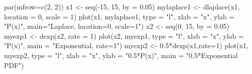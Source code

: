 \begin{Schunk}
\begin{Sinput}
 par(mfrow=c(2, 2)) 
 x1 <- seq(-15, 15, by = 0.05) 
 mylaplace1 <- dlaplace(x1, location = 0, scale = 1) 
 plot(x1, mylaplace1, type = "l", xlab = "x", ylab = "P(x)", 
  main="Laplace, location=0, scale=1")
 x2 <- seq(0, 15, by = 0.05)
 myexp1 <- dexp(x2, rate = 1) 
 plot(x2, myexp1, type = "l", xlab = "x", ylab = "P(x)", main = "Exponential, rate=1")
 myexp2 <- 0.5*dexp(x1,rate=1)
 plot(x1, myexp2, type = "l", xlab = "x", ylab = "0.5*P(x)", main = "0.5*Exponential PDF") 
 
\end{Sinput}
\end{Schunk}
